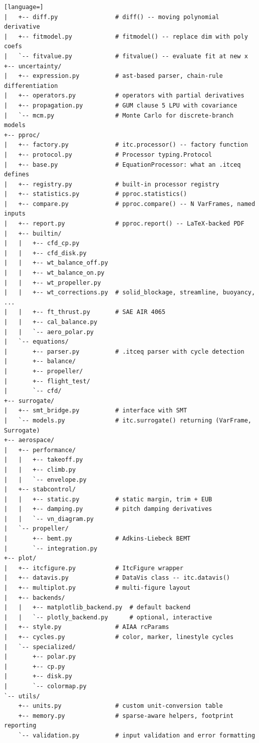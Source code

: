 \begin{lstlisting}[language=]
|   +-- diff.py                # diff() -- moving polynomial derivative
|   +-- fitmodel.py            # fitmodel() -- replace dim with poly coefs
|   `-- fitvalue.py            # fitvalue() -- evaluate fit at new x
+-- uncertainty/
|   +-- expression.py          # ast-based parser, chain-rule differentiation
|   +-- operators.py           # operators with partial derivatives
|   +-- propagation.py         # GUM clause 5 LPU with covariance
|   `-- mcm.py                 # Monte Carlo for discrete-branch models
+-- pproc/
|   +-- factory.py             # itc.processor() -- factory function
|   +-- protocol.py            # Processor typing.Protocol
|   +-- base.py                # EquationProcessor: what an .itceq defines
|   +-- registry.py            # built-in processor registry
|   +-- statistics.py          # pproc.statistics()
|   +-- compare.py             # pproc.compare() -- N VarFrames, named inputs
|   +-- report.py              # pproc.report() -- LaTeX-backed PDF
|   +-- builtin/
|   |   +-- cfd_cp.py
|   |   +-- cfd_disk.py
|   |   +-- wt_balance_off.py
|   |   +-- wt_balance_on.py
|   |   +-- wt_propeller.py
|   |   +-- wt_corrections.py  # solid_blockage, streamline, buoyancy, ...
|   |   +-- ft_thrust.py       # SAE AIR 4065
|   |   +-- cal_balance.py
|   |   `-- aero_polar.py
|   `-- equations/
|       +-- parser.py          # .itceq parser with cycle detection
|       +-- balance/
|       +-- propeller/
|       +-- flight_test/
|       `-- cfd/
+-- surrogate/
|   +-- smt_bridge.py          # interface with SMT
|   `-- models.py              # itc.surrogate() returning (VarFrame, Surrogate)
+-- aerospace/
|   +-- performance/
|   |   +-- takeoff.py
|   |   +-- climb.py
|   |   `-- envelope.py
|   +-- stabcontrol/
|   |   +-- static.py          # static margin, trim + EUB
|   |   +-- damping.py         # pitch damping derivatives
|   |   `-- vn_diagram.py
|   `-- propeller/
|       +-- bemt.py            # Adkins-Liebeck BEMT
|       `-- integration.py
+-- plot/
|   +-- itcfigure.py           # ItcFigure wrapper
|   +-- datavis.py             # DataVis class -- itc.datavis()
|   +-- multiplot.py           # multi-figure layout
|   +-- backends/
|   |   +-- matplotlib_backend.py  # default backend
|   |   `-- plotly_backend.py      # optional, interactive
|   +-- style.py               # AIAA rcParams
|   +-- cycles.py              # color, marker, linestyle cycles
|   `-- specialized/
|       +-- polar.py
|       +-- cp.py
|       +-- disk.py
|       `-- colormap.py
`-- utils/
    +-- units.py               # custom unit-conversion table
    +-- memory.py              # sparse-aware helpers, footprint reporting
    `-- validation.py          # input validation and error formatting
\end{lstlisting}


